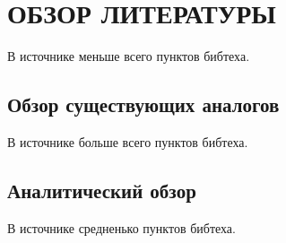 \section{ОБЗОР ЛИТЕРАТУРЫ}
\label{sec:domain}

В источнике \cite{qtransform} меньше всего пунктов бибтеха.

\subsection{Обзор существующих аналогов}
\label{sub:domain:analogs}

В источнике \cite{yandex_blog} больше всего пунктов бибтеха.

\subsection{Аналитический обзор}
\label{sub:domain:analitic_overview}

В источнике \cite{mfcc} средненько пунктов бибтеха.
